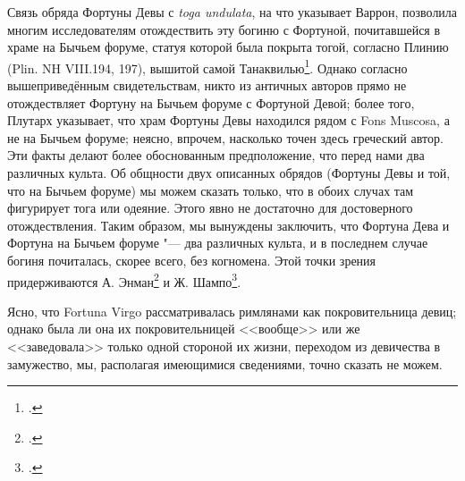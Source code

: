 
Связь обряда Фортуны Девы с \textit{toga undulata}, на что указывает Варрон, позволила многим исследователям отождествить эту богиню с Фортуной, почитавшейся в храме на Бычьем форуме, статуя которой была покрыта тогой, согласно Плинию (Plin. NH VIII.194, 197), вышитой самой Танаквилью\footcites[S. 182]{Preller1883}[Sp. 1510]{Peter1890Fortuna}[S. 207]{Wissowa1902}[Sp. 19]{FortunaOtto1910}[С. 73]{Nemirovsky1964}[P. 503]{Kajanto1981}. Однако согласно вышеприведённым свидетельствам, никто из античных авторов прямо не отождествляет Фортуну на Бычьем форуме с Фортуной Девой; более того, Плутарх указывает, что храм Фортуны Девы находился рядом с Fons Muscosa, а не на Бычьем форуме; неясно, впрочем, насколько точен здесь греческий автор. Эти факты делают более обоснованным предположение, что перед нами два различных культа. Об общности двух описанных обрядов (Фортуны Девы и той, что на Бычьем форуме) мы можем сказать только, что в обоих случах там фигурирует тога или одеяние. Этого явно не достаточно для достоверного отождествления. Таким образом, мы вынуждены заключить, что Фортуна Дева и Фортуна на Бычьем форуме "--- два различных культа, и в последнем случае богиня почиталась, скорее всего, без когномена. Этой точки зрения придерживаются А. Энман\footcite[Комм. к с. 226]{Enman1896} и Ж. Шампо\footcite[P. 270]{Champeaux1982}.

Ясно, что Fortuna Virgo рассматривалась римлянами как покровительница девиц; однако была ли она их покровительницей <<вообще>> или же <<заведовала>> только одной стороной их жизни, переходом из девичества в замужество, мы, располагая имеющимися сведениями, точно сказать не можем.

